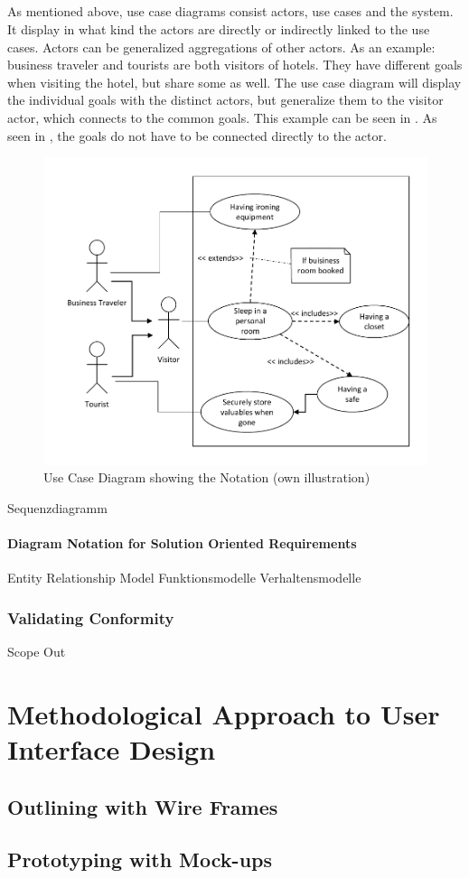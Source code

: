 \paragraph{} As mentioned above, use case diagrams consist actors, use cases and the system. It display in what kind the actors are directly or indirectly linked to the use cases. Actors can be generalized aggregations of other actors. As an example: business traveler and tourists are both visitors of hotels. They have different goals when visiting the hotel, but share some as well. The use case diagram will display the individual goals with the distinct actors, but generalize them to the visitor actor, which connects to the common goals. This example can be seen in . As seen in , the goals do not have to be connected directly to the actor.
\begin{figure}[H]
    \centering
    \includegraphics[scale=1]{img/ucEx.pdf}
    \caption[Example Use Case Diagram]{Use Case Diagram showing the Notation (own illustration)}
    \label{fig:ucEx}
\end{figure}
Sequenzdiagramm
\clearpage
\subsubsection{Diagram Notation for Solution Oriented Requirements}
Entity Relationship Model
Funktionsmodelle
Verhaltensmodelle
\clearpage
\subsection{Validating Conformity}
Scope Out
\clearpage
\chapter{Methodological Approach to User Interface Design}
\section{Outlining with Wire Frames}
\clearpage
\section{Prototyping with Mock-ups}
